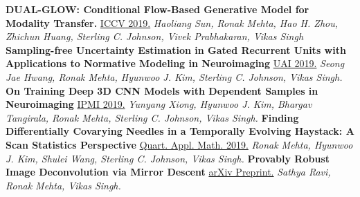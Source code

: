 \documentclass[]{article}
\begin{document}
{\bf  DUAL-GLOW: Conditional Flow-Based Generative Model for Modality Transfer.}
\newline
\href{http://openaccess.thecvf.com/content_ICCV_2019/html/Sun_DUAL-GLOW_Conditional_Flow-Based_Generative_Model_for_Modality_Transfer_ICCV_2019_paper.html}{ICCV 2019.}
\textit{Haoliang Sun, Ronak Mehta, Hao H. Zhou, Zhichun Huang, Sterling C. Johnson, Vivek Prabhakaran, Vikas Singh}
\newline\newline
{\bf Sampling-free Uncertainty Estimation in Gated Recurrent Units with Applications to Normative Modeling in Neuroimaging }
\newline
\href{http://auai.org/uai2019/proceedings/papers/296.pdf}{UAI 2019.}
\textit{Seong Jae Hwang, Ronak Mehta, Hyunwoo J. Kim, Sterling C. Johnson, Vikas Singh.}
\newline\newline
{\bf On Training Deep 3D CNN Models with Dependent Samples in Neuroimaging}
\newline
\href{https://link.springer.com/chapter/10.1007/978-3-030-20351-1_8}{IPMI 2019.}
\textit{Yunyang Xiong, Hyunwoo J. Kim, Bhargav Tangirala, Ronak Mehta, Sterling C. Johnson, Vikas Singh.}
\newline\newline
{\bf   Finding Differentially Covarying Needles in a Temporally Evolving Haystack: A Scan Statistics Perspective }
\newline
\href{https://www.ams.org/journals/qam/2019-77-02/S0033-569X-2018-01522-9/}{Quart. Appl. Math. 2019.}
\textit{Ronak Mehta, Hyunwoo J. Kim, Shulei Wang, Sterling C. Johnson, Vikas Singh.}
\newline\newline
{\bf Provably Robust Image Deconvolution via Mirror Descent}
\newline
\href{https://arxiv.org/abs/1803.08137}{arXiv Preprint.}
\textit{Sathya Ravi, Ronak Mehta, Vikas Singh.}
\end{document}
